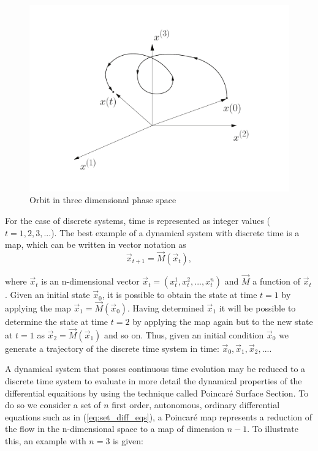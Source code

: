 \begin{figure}[H]
\centering
\includegraphics[width=1.\textwidth]{Figures/orbit_3d.pdf}
\caption{Orbit in three dimensional phase space}
\label{fig:3d_orbit_ps}
\end{figure}

For the case of discrete systems, time is represented as integer values ($t=1,2,3,...$). The best example of a dynamical system with discrete time is a map, which can be written in vector notation as
\begin{equation}
\vec{x} _{t+1}=\vec{M}(\vec{x}_t),
\label{eq:discrete_dyn_sys}
\end{equation}

where $\vec{x}_t$ is an n-dimensional vector $\vec{x}_t=(x^{1}_t,x^{2}_t,...,x^{n}_t)$ and $\vec{M}$ a function of $\vec{x}_t$. Given an initial state $\vec{x}_0$, it is possible to obtain the state at time $t=1$ by applying the map $\vec{x}_{1}=\vec{M}(\vec{x}_0)$. Having determined $\vec{x}_1$ it will be possible to determine the state at time $t=2$ by applying the map again but to the new state at $t=1$ as $\vec{x}_2=\vec{M}(\vec{x}_1)$ and so on. Thus, given an initial condition $\vec{x}_0$ we generate a trajectory of the discrete time system in time: $\vec{x}_0,\vec{x}_1,\vec{x}_2,...$. 

A dynamical system that posses continuous time evolution may be reduced to a discrete time system to evaluate in more detail the dynamical properties of the differential equaitions by using the technique called Poincaré Surface Section. To do so we consider a set of $n$ first order, autonomous, ordinary differential equations such as in  (\ref{eq:set_diff_eqs}), a Poincaré map represents a reduction of the flow in the n-dimensional space to a map of dimension $n-1$. To illustrate this, an example with $n=3$ is given:

